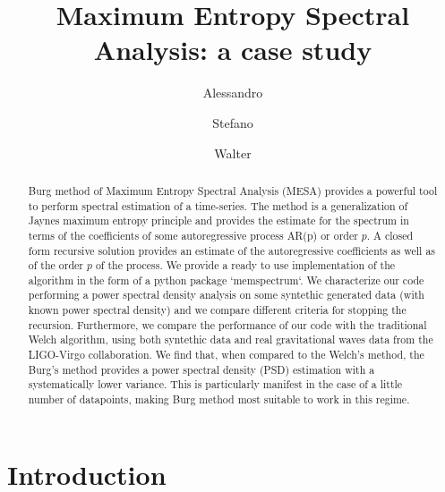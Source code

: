 \documentclass[twocolumn,showpacs,preprintnumbers,nofootinbib,prd,
superscriptaddress,10pt]{revtex4-1}
\begin{document}
\begin{abstract}
Burg method of Maximum Entropy Spectral Analysis (MESA) provides a powerful tool to perform spectral estimation of a time-series. The method is a generalization of Jaynes maximum entropy principle and provides the estimate for the spectrum in terms of the coefficients of some autoregressive process AR(p) or order $p$.
A closed form recursive solution provides an estimate of the autoregressive coefficients as well as of the order $p$ of the process.
We provide a ready to use implementation of the algorithm in the form of a python package `memspectrum`. We characterize our code performing a power spectral density analysis on some syntethic generated data (with known power spectral density) and we compare different criteria for stopping the recursion. Furthermore, we compare the performance of our code with the traditional Welch algorithm, using both syntethic data and real gravitational waves data from the LIGO-Virgo collaboration.
We find that, when compared to the Welch's method, the Burg's method provides a power spectral density (PSD) estimation with a systematically lower variance. This is particularly manifest in the case of a little number of datapoints, making Burg method most suitable to work in this regime.

\end{abstract}
	
	\title{Maximum Entropy Spectral Analysis: a case study}
	\author{Alessandro }
	\author{Stefano }
	\author{Walter }
  
	
	\maketitle
	\tableofcontents


\section{Introduction}
\end{document}
